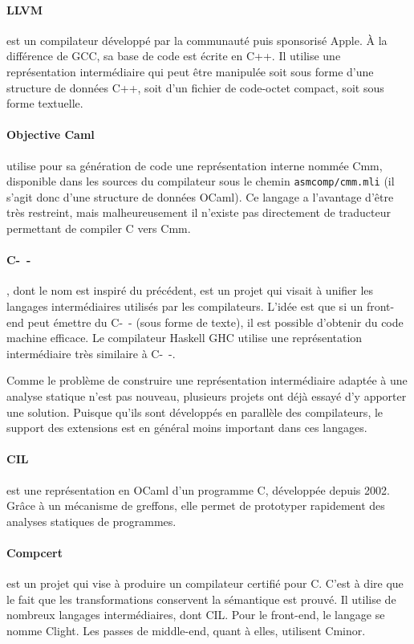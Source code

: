 \paragraph{LLVM}\cite{llvm-pres} est un compilateur développé par la communauté
puis sponsorisé Apple. À la différence de GCC, sa base de code est écrite en
C++. Il utilise une représentation intermédiaire qui peut être manipulée soit
sous forme d'une structure de données C++, soit d'un fichier de code-octet
compact, soit sous forme textuelle.

\paragraph{Objective Caml} utilise pour sa génération de code
une représentation interne nommée Cmm, disponible dans les sources du
compilateur sous le chemin \texttt{asmcomp/cmm.mli} (il s'agit donc d'une
structure de données OCaml). Ce langage a l'avantage d'être très restreint, mais
malheureusement il n'existe pas directement de traducteur permettant de compiler
C vers Cmm.

\paragraph{C-~-}\cite{spjcmm} , dont le nom est inspiré du précédent,
est un projet qui visait à unifier les langages intermédiaires utilisés par les
compilateurs. L'idée est que si un front-end peut émettre du C-~- (sous forme de
texte), il est possible d'obtenir du code machine efficace. Le compilateur
Haskell GHC utilise une représentation intermédiaire très similaire à C-~-.

Comme le problème de construire une représentation intermédiaire adaptée à une
analyse statique n'est pas nouveau, plusieurs projets ont déjà essayé d'y
apporter une solution. Puisque qu'ils sont développés en parallèle des
compilateurs, le support des extensions est en général moins important dans ces
langages.

\paragraph{CIL}\cite{NeculaCil}  est une représentation en
OCaml d'un programme C, développée depuis 2002. Grâce à un mécanisme de
greffons, elle permet de prototyper rapidement des analyses statiques de
programmes.

\paragraph{Compcert} est un projet qui vise à produire un compilateur certifié
pour C. C'est à dire que le fait que les transformations conservent la
sémantique est prouvé. Il utilise de nombreux langages intermédiaires, dont CIL.
Pour le front-end, le langage se nomme Clight\cite{cfront}. Les passes de
middle-end, quant à elles, utilisent Cminor\cite{cminorSL}.

